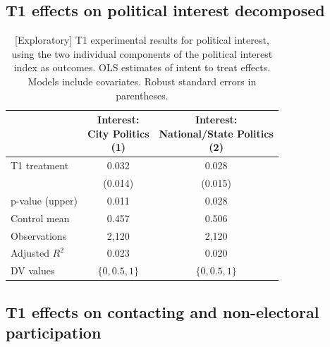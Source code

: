 \documentclass[
  11.5pt,
]{article}
\begin{document}
\clearpage

\hypertarget{t1-effects-on-political-interest-decomposed}{%
\subsection{T1 effects on political interest
decomposed}\label{t1-effects-on-political-interest-decomposed}}

\begin{table}[!h]

\caption{\label{tab:unnamed-chunk-55}[Exploratory] T1 experimental results for political interest, using the two individual components of the political interest index as outcomes. OLS estimates of intent to treat effects. Models include covariates. Robust standard errors in parentheses.}
\centering
\begin{tabular}[t]{lcc}
\toprule
 & \makecell[c]{Interest:\\ City Politics\\ (1)} & \makecell[c]{Interest:\\ National/State Politics\\ (2)}\\
\midrule
T1 treatment & 0.032 & 0.028\\
 & (0.014) & (0.015)\\
\midrule
p-value (upper) & 0.011 & 0.028\\
Control mean & 0.457 & 0.506\\
Observations & 2,120 & 2,120\\
Adjusted $R^2$ & 0.023 & 0.020\\
DV values & $\{0, 0.5, 1\}$ & $\{0, 0.5, 1\}$\\
\bottomrule
\end{tabular}
\end{table}

\clearpage

\hypertarget{t1-effects-on-contacting-and-non-electoral-participation}{%
\subsection{T1 effects on contacting and non-electoral
participation}\label{t1-effects-on-contacting-and-non-electoral-participation}}
\end{document}
